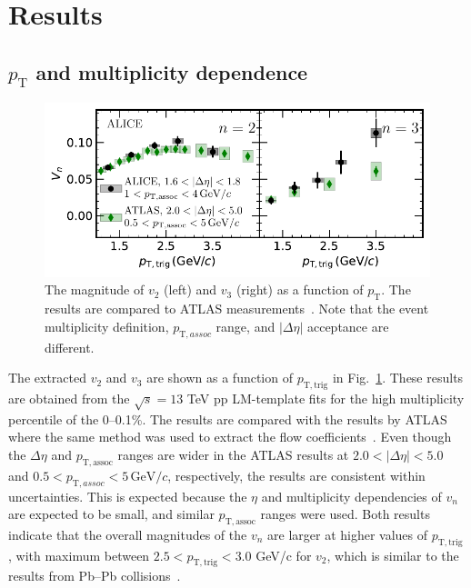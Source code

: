 
\section {Results}
\label{sec:results}
\subsection{$p_{\mathrm{T}}$ and multiplicity dependence}

\begin{figure}[h!]
	\centering
	\includegraphics[width=1.0 \textwidth]{figures/Fig2_vn.pdf} 
	\caption{The magnitude of $v_2$ (left) and $v_3$ (right) as a function of $p_\mathrm{T}$. The results are compared to ATLAS measurements~\cite{ATLAS:2016yzd}. Note that the event multiplicity definition, $p_{\mathrm{T},assoc}$ range, and $|\Delta\eta|$ acceptance are different.}
	\label{fig:vn}
\end{figure}

The extracted $v_2$ and $v_3$ are shown as a function of $p_{\mathrm{T},\mathrm{trig}}$ in Fig.~\ref{fig:vn}. These results are obtained from the $\sqrt{s}=13$ TeV pp LM-template fits for the high multiplicity percentile of the 0--0.1\%. The results are compared with the results by ATLAS where the same method was used to extract the flow coefficients~\cite{ATLAS:2016yzd}. Even though the $\Delta\eta$ and $p_{\mathrm{T},\mathrm{assoc}}$ ranges are wider in the ATLAS results at $2.0<|\Delta\eta|<5.0$ and $0.5<p_{\mathrm{T},assoc}<5\,\mathrm{GeV}/c$, respectively, the results are consistent within uncertainties. This is expected because the $\eta$ and multiplicity dependencies of $v_n$ are expected to be small, and similar $p_{\mathrm{T,assoc}}$ ranges were used. Both results indicate that the overall magnitudes of the $v_n$ are larger at higher values of $p_{\mathrm{T},\mathrm{trig}}$, with maximum between $2.5<p_{\mathrm{T},\mathrm{trig}}<3.0$ GeV/c for $v_2$, which is similar to the results from Pb--Pb collisions~\cite{ALICE:2018yph}.

